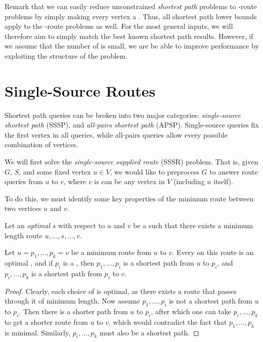 \documentclass{cccg13}
\begin{document}
Remark that we can easily reduce unconstrained \emph{shortest path} problems to \supplied{}-route problems by simply making every vertex a \supplier{}. Thus, all shortest path lower bounds apply to the \supplied{}-route problems as well. For the most general inputs, we will therefore aim to simply match the best known shortest path results. However, if we assume that the number of \suppliers is small, we are be able to improve performance by exploiting the structure of the problem.





\section{Single-Source \Supplied{} Routes}
Shortest path queries can be broken into two major categories: \emph{single-source shortest path} (SSSP), and \emph{all-pairs shortest path} (APSP). Single-source queries fix the first vertex in all queries, while all-pairs queries allow every possible combination of vertices. 

We will first solve the \emph{single-source supplied route} (SSSR) problem. That is, given $G$, $S$, and some fixed vertex $u \in V$, we would like to preprocess $G$ to answer \supplied{} route queries from $u$ to $v$, where $v$ is can be any vertex in $V$ (including $u$ itself).

To do this, we must identify some key properties of the minimum \supplied{} route between two vertices $u$ and $v$.

\begin{lemma}
    \label{lem:two-paths}
    Let an \emph{optimal \supplier{}} $s$ with respect to $u$ and $v$ be a \supplier{} such that there exists a minimum length route $u,\dots,s,\dots,v$.

    Let $u = p_1,\dots,p_k = v$ be a minimum \supplied{} route from $u$ to $v$. Every \supplier{} on this route is an optimal \supplier{}, and if $p_i$ is a \supplier{}, then $p_1,\dots, p_i$ is a shortest path from $u$ to $p_i$, and $p_i,\dots,p_k$ is a shortest path from $p_i$ to $v$.
\end{lemma}

\begin{proof}
    Clearly, each choice of \supplier{} is optimal, as there exists a route that passes through it of minimum length. Now assume $p_1, \dots, p_i$ is not a shortest path from $u$ to $p_i$. Then there is a shorter path from $u$ to $p_i$, after which one can take $p_i,\dots,p_k$ to get a shorter \supplied{} route from $u$ to $v$, which would contradict the fact that $p_1, \dots, p_k$ is minimal. Similarly, $p_i, \dots, p_k$ must also be a shortest path.
\end{proof}
\end{document}
